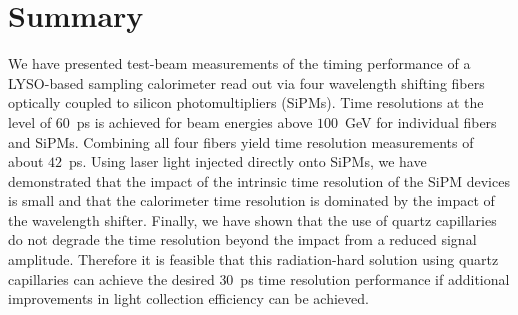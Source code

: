 \section{Summary}

We have presented test-beam measurements of the timing performance of a
LYSO-based sampling calorimeter read out via four wavelength shifting fibers
optically coupled to silicon photomultipliers (SiPMs). Time resolutions at the
level of $60$~ps is achieved for beam energies above $100$~GeV for individual
fibers and SiPMs. Combining all four fibers yield time resolution measurements
of about $42$~ps. Using laser light injected directly onto SiPMs, we have
demonstrated that the impact of the intrinsic time resolution of the SiPM
devices is small and that the calorimeter time resolution is dominated by the
impact of the wavelength shifter. Finally, we have shown that the use of quartz
capillaries do not degrade the time resolution beyond the impact from a reduced
signal amplitude. Therefore it is feasible that this radiation-hard solution
using quartz capillaries can achieve the desired $30$~ps time resolution
performance if additional improvements in light collection efficiency can be
achieved.
